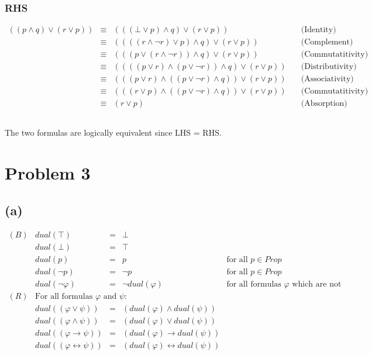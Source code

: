 \documentclass{article} %
\begin{document}
\subsubsection*{RHS}
\[\begin{array}{rllr}
    ((p \wedge q) \vee (r \vee p))  &\equiv& (((\bot \vee p) \wedge q) \vee (r \vee p))   &\quad\mbox{(Identity)}\\
                                    &\equiv& ((((r \wedge \neg r) \vee p) \wedge q) \vee (r \vee p))    &\quad\mbox{(Complement)}\\
                                    &\equiv& (((p \vee (r \wedge \neg r)) \wedge q) \vee (r \vee p))    &\quad\mbox{(Commutatitivity)}\\
                                    &\equiv& ((((p \vee r) \wedge (p \vee \neg r)) \wedge q) \vee (r \vee p))   &\quad\mbox{(Distributivity)}\\
                                    &\equiv& (((p \vee r) \wedge ((p \vee \neg r) \wedge q)) \vee (r \vee p))   &\quad\mbox{(Associativity)}\\
                                    &\equiv& (((r \vee p) \wedge ((p \vee \neg r) \wedge q)) \vee (r \vee p))   &\quad\mbox{(Commutatitivity)}\\
                                    &\equiv& (r \vee p) &\quad\mbox{(Absorption)}\\

\end{array}\]
\subsubsection*{}
The two formulas are logically equivalent since LHS = RHS.

\section*{Problem 3}
\subsection*{(a)}
\[\begin{array}{lrlll}
    (B) &dual(\top)     &=& \bot\\
        &dual(\bot)     &=& \top\\
        &dual(p)        &=& p           &\mbox{for all $p \in Prop$}\\
        &dual(\neg p)   &=& \neg p      &\mbox{for all $p \in Prop$}\\
        &dual(\neg \varphi) &=& \neg dual(\varphi)  &\mbox{for all formulas $\varphi$  which are not propositional variables}\\
    (R) &\mbox{For all formulas $\varphi$ and $\psi$:}\\
        &dual((\varphi \vee \psi))      &=& (dual(\varphi) \wedge dual(\psi))\\
        &dual((\varphi \wedge \psi))    &=& (dual(\varphi) \vee dual(\psi))\\
        &dual((\varphi \to \psi))    &=& (dual(\varphi) \to dual(\psi))\\
        &dual((\varphi \leftrightarrow \psi))    &=& (dual(\varphi) \leftrightarrow dual(\psi))\\
\end{array}\]
\end{document}
